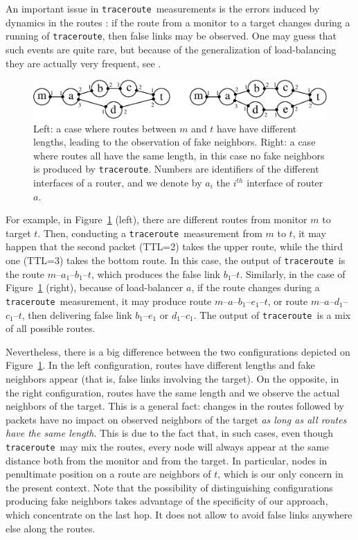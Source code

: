 \documentclass[conference]{IEEEtran}
\newcommand{\traceroute}{{\tt traceroute}}
\begin{document}
An important issue in \traceroute\ measurements is the errors induced by dynamics in the routes \cite{willinger,DBLP:journals/cn/VigerACMLFT08,DBLP:conf/imc/AugustinCOVFLMT06}: if the route from a monitor to a target changes during a running of \traceroute, then false links may be observed. One may guess that such events are quite rare, but because of the generalization of load-balancing they are actually very frequent, see \cite{DBLP:journals/cn/VigerACMLFT08,DBLP:conf/imc/AugustinCOVFLMT06}.

\begin{figure}
\centering
\includegraphics[scale=.24]{dyn.eps}
\caption{
Left: a case where routes between $m$ and $t$ have have different lengths, leading to the observation of fake neighbors. Right: a case where routes all have the same length, in this case no fake neighbors is produced by \traceroute.
Numbers are identifiers of the different interfaces of a router, and we denote by $a_i$ the $i^{th}$ interface of router $a$.
}
\label{fig-dyn}
\end{figure}


For example, in Figure~\ref{fig-dyn} (left), there are different routes from monitor $m$ to target $t$. Then, conducting a \traceroute\ measurement from $m$ to $t$, it may happen that the second packet (TTL=2) takes the upper route, while the third one (TTL=3) takes the bottom route. In this case, the output of \traceroute\ is the route $m$--$a_1$--$b_1$--$t$, which produces the false link $b_1$--$t$.
Similarly, in the case of Figure~\ref{fig-dyn} (right), because of load-balancer $a$, if the route changes during a \traceroute\ measurement, it may produce route $m$--$a$--$b_1$--$e_1$--$t$, or route $m$--$a$--$d_1$--$c_1$--$t$, then delivering false link $b_1$--$e_1$ or $d_1$--$c_1$. The output of \traceroute\ is a mix of all possible routes.


Nevertheless, there is a big difference between the two configurations depicted on Figure~\ref{fig-dyn}. 
In the left configuration, routes have different lengths and fake neighbors appear (that is, false links involving the target). On the opposite, in the right configuration, routes have the same length and we observe the actual neighbors of the target. This is a general fact: changes in the routes followed by packets have no impact on observed neighbors of the target {\em as long as all routes have the same length}. This is due to the fact that, in such cases, even though \traceroute\ may mix the routes, every node will always appear at the same distance both from the monitor and from the target. In particular, nodes in penultimate position on a route are neighbors of $t$, which is our only concern in the present context.
Note that the possibility of distinguishing configurations producing fake neighbors takes advantage of the specificity of our approach, which concentrate on the last hop. It does not allow to avoid false links anywhere else along the routes.
\end{document}
